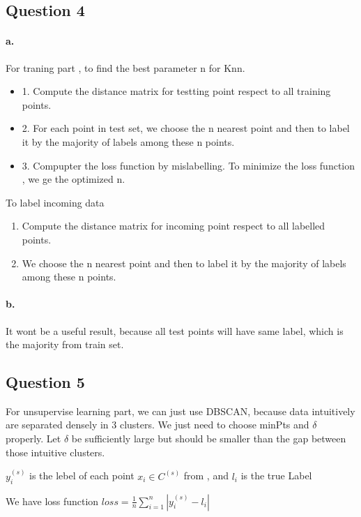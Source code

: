 \documentclass{article}
\begin{document}
\subsection*{Question 4}

\paragraph{a.}
For traning part , to find the best parameter n for Knn.
\begin{itemize}
  \item 1. Compute the distance matrix for testting point respect to all training points.
  \item 2. For each point in test set, we choose the n nearest point and then to label it by the majority of labels among these n points.
  \item 3. Compupter the loss function by mislabelling. To minimize the loss function , we ge the optimized n.
\end{itemize}

To label incoming data
\begin{enumerate}
  \item Compute the distance matrix for incoming point respect to all labelled points.
  \item We choose the n nearest point and then to label it by the majority of labels among these n points.
\end{enumerate}

\paragraph{b.}
It wont be a useful result, because all test points will have same label, which is the majority from train set.

\subsection*{Question 5}

For unsupervise learning part, we can just use DBSCAN, because data intuitively are separated densely in 3 clusters. We just need to choose minPts and $\delta$ properly.
Let $\delta$ be sufficiently large but should be smaller than the gap between those intuitive clusters.

$y_i^{(s)}$ is the lebel of each point $x_i \in C^{(s)}$ from , and $l_i$ is the true Label

We have loss function $ loss = \frac{1}{n} \sum^{n}_{i=1} |y_i^{(s)} -l_i|  $
\end{document}
